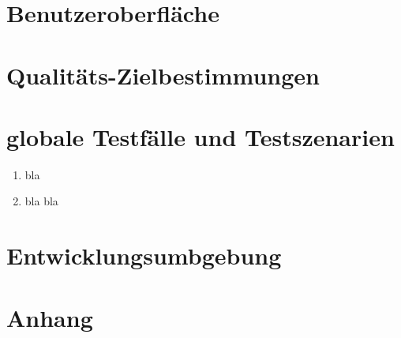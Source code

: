 \documentclass[parskip=full]{scrartcl}
\def\threedigits#1{%
  \ifnum#1<100 0\fi
  \ifnum#1<10 0\fi
  \number#1}
\begin{document}
\newpage
\section{Benutzeroberfläche}

\newpage
\section{Qualitäts-Zielbestimmungen}

\newpage
\section{globale Testfälle und Testszenarien}

\begin{enumerate}[label={\textbf{/T\protect\threedigits{\theenumi}0/}}, leftmargin=*]
	\item bla
	\item bla bla
\end{enumerate}

\newpage
\section{Entwicklungsumbgebung}

\newpage
\section{Anhang}

\newpage
\printglossary	
\end{document}
